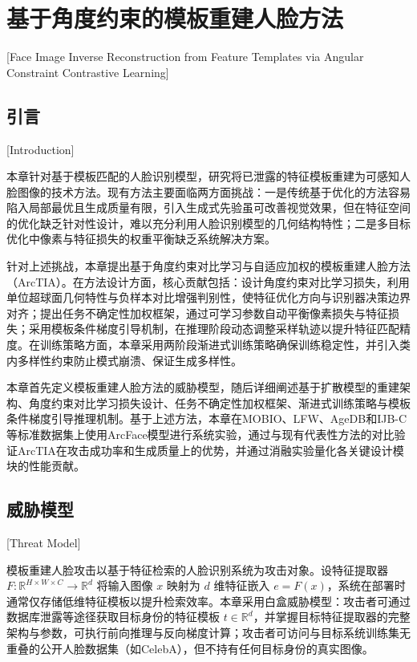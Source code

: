 \chapter{基于角度约束的模板重建人脸方法}[Face Image Inverse Reconstruction from Feature Templates via Angular Constraint Contrastive Learning]\label{chap:TIA}
\section{引言}[Introduction]

本章针对基于模板匹配的人脸识别模型，研究将已泄露的特征模板重建为可感知人脸图像的技术方法。现有方法主要面临两方面挑战：一是传统基于优化的方法容易陷入局部最优且生成质量有限，引入生成式先验虽可改善视觉效果，但在特征空间的优化缺乏针对性设计，难以充分利用人脸识别模型的几何结构特性；二是多目标优化中像素与特征损失的权重平衡缺乏系统解决方案。

针对上述挑战，本章提出基于角度约束对比学习与自适应加权的模板重建人脸方法（ArcTIA）。在方法设计方面，核心贡献包括：设计角度约束对比学习损失，利用单位超球面几何特性与负样本对比增强判别性，使特征优化方向与识别器决策边界对齐；提出任务不确定性加权框架，通过可学习参数自动平衡像素损失与特征损失；采用模板条件梯度引导机制，在推理阶段动态调整采样轨迹以提升特征匹配精度。在训练策略方面，本章采用两阶段渐进式训练策略确保训练稳定性，并引入类内多样性约束防止模式崩溃、保证生成多样性。

本章首先定义模板重建人脸方法的威胁模型，随后详细阐述基于扩散模型的重建架构、角度约束对比学习损失设计、任务不确定性加权框架、渐进式训练策略与模板条件梯度引导推理机制。基于上述方法，本章在MOBIO、LFW、AgeDB和IJB-C等标准数据集上使用ArcFace模型进行系统实验，通过与现有代表性方法的对比验证ArcTIA在攻击成功率和生成质量上的优势，并通过消融实验量化各关键设计模块的性能贡献。

\section{威胁模型}[Threat Model]

模板重建人脸攻击以基于特征检索的人脸识别系统为攻击对象。设特征提取器 $F: \mathbb{R}^{H \times W \times C} \to \mathbb{R}^d$ 将输入图像 $x$ 映射为 $d$ 维特征嵌入 $e = F(x)$，系统在部署时通常仅存储低维特征模板以提升检索效率。本章采用白盒威胁模型：攻击者可通过数据库泄露等途径获取目标身份的特征模板 $t \in \mathbb{R}^d$，并掌握目标特征提取器的完整架构与参数，可执行前向推理与反向梯度计算；攻击者可访问与目标系统训练集无重叠的公开人脸数据集（如CelebA），但不持有任何目标身份的真实图像。

